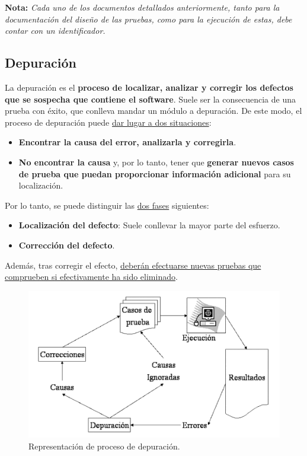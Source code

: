 \textbf{Nota:} \textit{Cada uno de los documentos detallados anteriormente, tanto para la documentación del diseño de las pruebas, como para la ejecución de estas, debe contar con un identificador.}

\subsection{Depuración}
La depuración es el \textbf{proceso de localizar, analizar y corregir los defectos que se sospecha que contiene el software}. Suele ser la consecuencia de una prueba con éxito, que conlleva mandar un módulo a depuración. De este modo, el proceso de depuración puede \uline{dar lugar a dos situaciones}:

\begin{itemize}
    \item \textbf{Encontrar la causa del error, analizarla y corregirla}.
    \item \textbf{No encontrar la causa} y, por lo tanto, tener que \textbf{generar nuevos casos de prueba que puedan proporcionar información adicional} para su localización.
\end{itemize}

Por lo tanto, se puede distinguir las \uline{dos fases} siguientes:

\begin{itemize}
    \item \textbf{Localización del defecto}: Suele conllevar la mayor parte del esfuerzo.
    \item \textbf{Corrección del defecto}.
\end{itemize}

Además, tras corregir el efecto, \uline{deberán efectuarse nuevas pruebas que comprueben si efectivamente ha sido eliminado}.

\begin{figure}[H]
    \centering
    \includegraphics[width=0.7\linewidth]{Resources/Tema6/ProcesoDepuracion.png}
    \caption{Representación de proceso de depuración.}
\end{figure}

